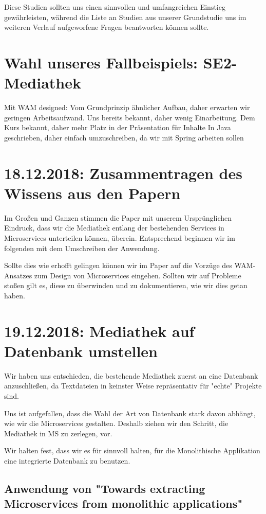 \documentclass{article}
\begin{document}
Diese Studien sollten uns einen sinnvollen und umfangreichen Einstieg gewährleisten, während die Liste an Studien aus unserer Grundstudie uns im weiteren Verlauf aufgeworfene Fragen beantworten können sollte.

\section{Wahl unseres Fallbeispiels: SE2-Mediathek}

Mit WAM designed: Vom Grundprinzip ähnlicher Aufbau, daher erwarten wir geringen Arbeitsaufwand.
Uns bereits bekannt, daher wenig Einarbeitung.
Dem Kurs bekannt, daher mehr Platz in der Präsentation für Inhalte
In Java geschrieben, daher einfach umzuschreiben, da wir mit Spring arbeiten sollen


\section{18.12.2018: Zusammentragen des Wissens aus den Papern}

Im Großen und Ganzen stimmen die Paper mit unserem Ursprünglichen Eindruck, dass wir die Mediathek entlang der bestehenden Services in Microservices unterteilen können, überein.
Entsprechend beginnen wir im folgenden mit dem Umschreiben der Anwendung.

Sollte dies wie erhofft gelingen können wir im Paper auf die Vorzüge des WAM-Ansatzes zum Design von Microservices eingehen. Sollten wir auf Probleme stoßen gilt es, diese zu überwinden und zu dokumentieren, wie wir dies getan haben.

\section{19.12.2018: Mediathek auf Datenbank umstellen}

Wir haben uns entschieden, die bestehende Mediathek zuerst an eine Datenbank anzuschließen, da Textdateien in keinster Weise repräsentativ für "echte" Projekte sind.

Uns ist aufgefallen, dass die Wahl der Art von Datenbank stark davon abhängt, wie wir die Microservices gestalten. Deshalb ziehen wir den Schritt, die Mediathek in MS zu zerlegen, vor.

Wir halten fest, dass wir es für sinnvoll halten, für die Monolithische Applikation eine integrierte Datenbank zu benutzen.

\subsection{Anwendung von "Towards extracting Microservices from monolithic applications"}
\end{document}
